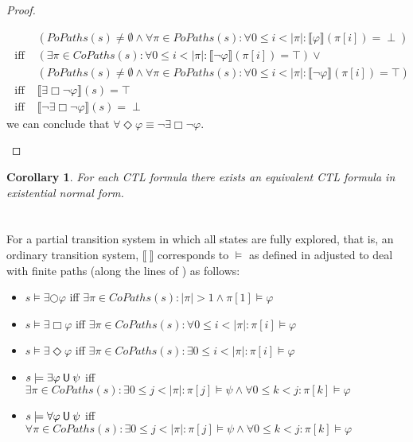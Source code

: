 \documentclass[12pt]{article}
\newcommand{\always}{\Box}
\newcommand{\eventually}{\Diamond}
\newcommand{\nxt}{\bigcirc}
\newcommand{\until}{\mathbin{\sf U}}
\newtheorem{corollary}{Corollary}
\theoremstyle{definition}
\newcommand{\satisfaction}[1]{\llbracket #1 \rrbracket}
\begin{document}
\begin{proof}
\begin{enumerate}
\begin{align*}
& (\mathit{PoPaths}(s) \not= \emptyset \wedge \forall \pi \in \mathit{PoPaths}(s) : \forall 0 \leq i < |\pi| : \satisfaction{\varphi}(\pi[i]) = \perp)\\
\mbox{ iff } & (\exists \pi \in \mathit{CoPaths}(s) : \forall 0 \leq i < |\pi| : \satisfaction{\neg \varphi}(\pi[i]) = \top) \vee\\
& (\mathit{PoPaths}(s) \not= \emptyset \wedge \forall \pi \in \mathit{PoPaths}(s) : \forall 0 \leq i < |\pi| : \satisfaction{\neg \varphi}(\pi[i]) = \top)\\
\mbox{ iff } & \satisfaction{\exists \always \neg \varphi}(s) = \top\\
\mbox{ iff } & \satisfaction{\neg \exists \always \neg \varphi}(s) = \perp
\end{align*}
we can conclude that $\forall \eventually \varphi \equiv \neg \exists \always \neg \varphi$.
\end{enumerate}
\end{proof}

\begin{corollary}
For each CTL formula there exists an equivalent CTL formula in existential normal form.
\end{corollary}

\section{}

For a partial transition system in which all states are fully explored, that is, an ordinary transition system, $\satisfaction{\ }$ corresponds to $\models$ as defined in \cite[Definition~6.4]{BK08} adjusted to deal with finite paths (along the lines of \cite{GV13}) as follows:
\begin{itemize}
\item 
$s \models \exists \nxt \varphi$ iff $\exists \pi \in \mathit{CoPaths}(s): |\pi| > 1 \wedge \pi[1] \models \varphi$ 
\item
$s \models \exists \always \varphi$ iff $\exists \pi \in \mathit{CoPaths}(s) : \forall 0 \leq i < |\pi| : \pi[i] \models \varphi$
\item
$s \models \exists \eventually \varphi$ iff $\exists \pi \in \mathit{CoPaths}(s) : \exists 0 \leq i < |\pi| : \pi[i] \models \varphi$
\item
$s \models \exists \varphi \until \psi$ iff $\exists \pi \in \mathit{CoPaths}(s) : \exists 0 \leq j < |\pi| : \pi[j] \models \psi \wedge \forall 0 \leq k < j : \pi[k] \models \varphi$
\item 
$s \models \forall \varphi \until \psi$ iff $\forall \pi \in \mathit{CoPaths}(s) : \exists 0 \leq j < |\pi| : \pi[j] \models \psi \wedge \forall 0 \leq k < j : \pi[k] \models \varphi$
\end{itemize}
\end{document}
